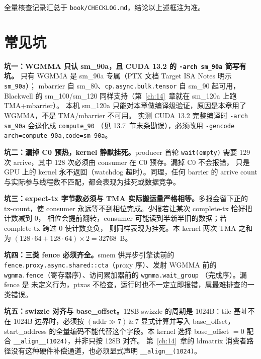 全量核查记录汇总于 \texttt{book/\allowbreak{}CHECKLOG.\allowbreak{}md}，结论以上述框注为准。

\section{常见坑}

\textbf{坑一：WGMMA 只认 sm\_90a，且 CUDA 13.2 的 \texttt{-arch sm\_90a} 简写有坑。}
只有 WGMMA 是 sm\_90a 专属（PTX 文档 Target ISA Notes 明示 \texttt{sm\_90a}）；
mbarrier 自 sm\_80、\texttt{cp.async.bulk.tensor} 自 sm\_90 起可用，Blackwell 的
sm\_100/sm\_120 同样支持（第~\ref{ch:14}~章就在 sm\_120a 上跑 TMA+mbarrier）。
本机 sm\_120a 只能对本章做编译级验证，原因是本章用了 WGMMA，不是 TMA/mbarrier 不可用。
实测 CUDA 13.2 完整编译时 \texttt{-arch sm\_90a} 会退化成 \texttt{compute\_90}
（见 13.7~节末条勘误），必须改用
\texttt{-gencode arch=\allowbreak{}compute\_\allowbreak{}90a,\allowbreak{}code=\allowbreak{}sm\_\allowbreak{}90a}。

\textbf{坑二：漏掉 C0 预热，kernel 静默挂死。}\allowbreak{}producer 首轮 \texttt{wait(empty)}
需要 129 次 arrive，其中 128 次必须由 consumer 在 C0 预存。漏掉 C0 不会报错，
只是 GPU 上的 kernel 永不返回（watchdog 超时）。同理，任何 barrier 的
arrive count 与实际参与线程数不匹配，都会表现为挂死或数据竞争。

\textbf{坑三：expect-tx 字节数必须与 TMA 实际搬运量严格相等。}多报会留下正的
tx-count，使 consumer 永远等不到相位完成。少报若让某次 complete-tx 恰好把计数减到 0，
相位会提前翻转，consumer 可能读到半新半旧的数据；若 complete-tx 跨过 0 使计数变负，
则同样表现为挂死。本 kernel 两次 TMA 之和为
$(128 \cdot 64 + 128 \cdot 64) \times 2 = 32768$~B。

\textbf{坑四：三类 fence 必须齐全。}\allowbreak{}smem 供异步引擎读前的
\texttt{fence.\allowbreak{}proxy.\allowbreak{}async.\allowbreak{}shared::\allowbreak{}cta}（proxy 序）、发射 WGMMA 前的
\texttt{wgmma.fence}（寄存器序）、访问累加器前的 \texttt{wgmma.\allowbreak{}wait\_\allowbreak{}group}
（完成序）。漏 fence 是
未定义行为，ptxas 不检查，运行时也不一定立即报错，属最难排查的一类错误。

\textbf{坑五：swizzle 对齐与 base\_offset。}\allowbreak{}128B swizzle 的周期是 1024B：tile
基址不在 1024B 边界时，必须按 $(\mathrm{addr} \gg 7) \,\&\, 7$ 显式计算并写入
base\_offset，start\_address 的全量编码不能代替这个字段。本 kernel 选择
base\_offset $=0$ 配合 \texttt{\_\allowbreak{}\_\allowbreak{}align\_\allowbreak{}\_\allowbreak{}(1024)}，并非只按 128B 对齐。
第~\ref{ch:14}~章的 ldmatrix 消费者路径没有这种硬件补偿通道，也必须显式声明
\texttt{\_\allowbreak{}\_\allowbreak{}align\_\allowbreak{}\_\allowbreak{}(1024)}。

